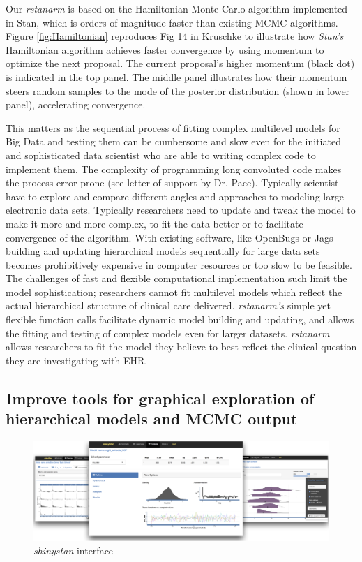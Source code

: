 \documentclass[11pt,notitlepage]{article}
\begin{document}
Our \textit{rstanarm} is based on the Hamiltonian Monte Carlo algorithm implemented in Stan, which is orders of magnitude faster than existing MCMC algorithms. Figure \ref{fig:Hamiltonian} reproduces Fig 14 in Kruschke \cite{Kruschke_Book_2014} to illustrate how \textit{Stan's} Hamiltonian algorithm achieves faster convergence by using momentum to optimize the next proposal. The current proposal's higher momentum (black dot) is indicated in the top panel. The middle panel illustrates how their momentum steers random samples to the mode of the posterior distribution (shown in lower panel), accelerating convergence. 

This matters as the sequential process of fitting complex multilevel models for Big Data  and testing them can be cumbersome and slow even for the initiated and sophisticated data scientist who are able to writing complex code to implement them. The complexity of programming long convoluted code makes the process error prone (see letter of support by Dr. Pace). Typically scientist have to explore and compare different angles and approaches to modeling large electronic data sets. Typically researchers need to update and tweak the model to make it more and more complex, to fit the data better or to facilitate convergence of the algorithm. With existing software, like OpenBugs or Jags building and updating hierarchical models sequentially for large data sets becomes prohibitively expensive in computer resources or too slow to be feasible. The challenges of fast and flexible computational implementation such limit the model sophistication;  researchers cannot fit multilevel models which reflect the actual hierarchical structure of clinical care delivered. \textit{rstanarm's} simple yet flexible function calls facilitate dynamic model building and updating, and allows the fitting and testing of complex models even for larger datasets. \textit{rstanarm} allows researchers to fit the model they believe to best reflect the clinical question they are investigating with EHR.

\subsection*{Improve tools for graphical exploration of hierarchical models and MCMC output}

\begin{figure}
  \vspace{-10pt}
 \includegraphics[scale=0.85]{Figures/shinystan.png}
  \vspace{-10pt}
  \caption{\textit{shinystan} interface}
    \label{fig:shinystan}
 \vspace{- 10pt}
\end{figure}
\end{document}
